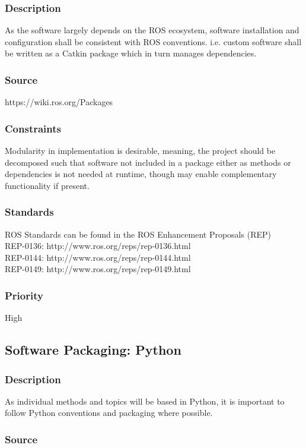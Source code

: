 \subsubsection{Description}
As the software largely depends on the ROS ecosystem, software installation and configuration shall be consistent with ROS conventions. i.e. custom software shall be written as a Catkin package which in turn manages dependencies.
\subsubsection{Source}
https://wiki.ros.org/Packages

\subsubsection{Constraints}
Modularity in implementation is desirable, meaning, the project should be decomposed such that software not included in a package either as methods or dependencies is not needed at runtime, though may enable complementary functionality if present.
\subsubsection{Standards}
ROS Standards can be found in the ROS Enhancement Proposals (REP) \\
REP-0136: http://www.ros.org/reps/rep-0136.html \\
REP-0144: http://www.ros.org/reps/rep-0144.html\\
REP-0149: http://www.ros.org/reps/rep-0149.html

\subsubsection{Priority}
High

\subsection{Software Packaging: Python}
\subsubsection{Description}
As individual methods and topics will be based in Python, it is important to follow Python conventions and packaging where possible. 
\subsubsection{Source}

